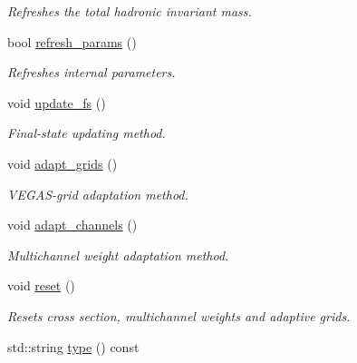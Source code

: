 \begin{DoxyCompactItemize}
\begin{DoxyCompactList}\small\item\em Refreshes the total hadronic invariant mass. \end{DoxyCompactList}\item 
\hypertarget{a00447_a0de27cdc3d77a3a73c9da779e2d04c40}{bool \hyperlink{a00447_a0de27cdc3d77a3a73c9da779e2d04c40}{refresh\-\_\-params} ()}\label{a00447_a0de27cdc3d77a3a73c9da779e2d04c40}

\begin{DoxyCompactList}\small\item\em Refreshes internal parameters. \end{DoxyCompactList}\item 
\hypertarget{a00447_a02089aae254ceb704dd7abc66407f580}{void \hyperlink{a00447_a02089aae254ceb704dd7abc66407f580}{update\-\_\-fs} ()}\label{a00447_a02089aae254ceb704dd7abc66407f580}

\begin{DoxyCompactList}\small\item\em Final-\/state updating method. \end{DoxyCompactList}\item 
\hypertarget{a00447_a560a1c8f3437b28b00f650f191f6ce21}{void \hyperlink{a00447_a560a1c8f3437b28b00f650f191f6ce21}{adapt\-\_\-grids} ()}\label{a00447_a560a1c8f3437b28b00f650f191f6ce21}

\begin{DoxyCompactList}\small\item\em V\-E\-G\-A\-S-\/grid adaptation method. \end{DoxyCompactList}\item 
\hypertarget{a00447_a81e174a16acf3240acb315522bbf6ea9}{void \hyperlink{a00447_a81e174a16acf3240acb315522bbf6ea9}{adapt\-\_\-channels} ()}\label{a00447_a81e174a16acf3240acb315522bbf6ea9}

\begin{DoxyCompactList}\small\item\em Multichannel weight adaptation method. \end{DoxyCompactList}\item 
\hypertarget{a00447_a3abc78349f929f2cb7be411d9851a7d1}{void \hyperlink{a00447_a3abc78349f929f2cb7be411d9851a7d1}{reset} ()}\label{a00447_a3abc78349f929f2cb7be411d9851a7d1}

\begin{DoxyCompactList}\small\item\em Resets cross section, multichannel weights and adaptive grids. \end{DoxyCompactList}\item 
\hypertarget{a00447_a84340eb426ff24e2adccb26fb30fc7c5}{std\-::string \hyperlink{a00447_a84340eb426ff24e2adccb26fb30fc7c5}{type} () const }\label{a00447_a84340eb426ff24e2adccb26fb30fc7c5}


\end{DoxyCompactItemize}
